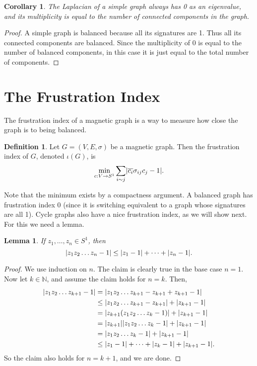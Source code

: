 \documentclass[12pt]{article}
\newtheorem{corollary}[thm]{Corollary}
\newtheorem{lem}[thm]{Lemma}
\theoremstyle{definition}
\newtheorem{defn}[thm]{Definition}
\newcommand{\N}{\mathbb N}
\DeclarePairedDelimiter\abs{\lvert}{\rvert}
\begin{document}
\begin{corollary}
The Laplacian of a simple graph always has 0 as an eigenvalue, and its multiplicity is equal to the number of connected components in the graph.
\end{corollary}
\begin{proof}
A simple graph is balanced because all its signatures are 1. Thus all its connected components are balanced. Since the multiplicity of 0 is equal to the number of balanced components, in this case it is just equal to the total number of components.
\end{proof}

\section{The Frustration Index}
The frustration index of a magnetic graph is a way to measure how close the graph is to being balanced.

\begin{defn}\label{defn: frustration index}
Let $G = (V, E, \sigma)$ be a magnetic graph. Then the frustration index of $G$, denoted $\iota(G)$, is 
$$
\min_{c: V \rightarrow S^1}
\sum_{i \sim j} 
\abs*{\overline{c_i} \sigma_{ij} c_j - 1}.
$$
\end{defn}

Note that the minimum exists by a compactness argument. A balanced graph has frustration index 0 (since it is switching equivalent to a graph whose signatures are all 1). Cycle graphs also have a nice frustration index, as we will show next. For this we need a lemma.

\begin{lem}\label{lemma for cycle frustration}
If $z_1, \dots, z_n \in S^1$, then
$$
\abs*{z_1 z_2 \dots z_n - 1} \leq \abs*{z_1 - 1} + \dots + \abs*{z_n - 1}.
$$
\end{lem}
\begin{proof}
We use induction on $n$. The claim is clearly true in the base case $n = 1$. Now let $k \in \N$, and assume the claim holds for $n = k$. Then,
\begin{align*}
\abs*{z_1 z_2 \dots z_{k+1} - 1}
&= \abs*{z_1 z_2 \dots z_{k+1} - z_{k+1} + z_{k+1} - 1} \\
&\leq \abs*{z_1 z_2 \dots z_{k+1} - z_{k+1}} + \abs*{z_{k+1} - 1}\\
&= \abs*{z_{k+1}(z_1 z_2 \dots z_{k} - 1)} + \abs*{z_{k+1} - 1} \\
&= \abs*{z_{k+1}} \abs*{z_1 z_2 \dots z_{k} - 1} + \abs*{z_{k+1} - 1} \\
&= \abs*{z_1 z_2 \dots z_{k} - 1} + \abs*{z_{k+1} - 1} \\
&\leq \abs*{z_1 - 1} + \dots + \abs*{z_k - 1} + \abs*{z_{k+1} - 1}.
\end{align*}
So the claim also holds for $n = k + 1$, and we are done.
\end{proof}
\end{document}
